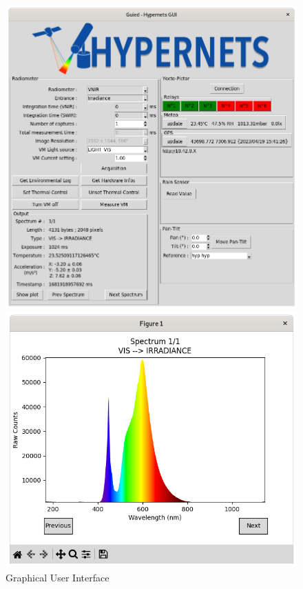 \begin{figure}[!ht]
  \centering
  \begin{minipage}[b]{0.48\textwidth}
	  \includegraphics[width=\linewidth]{images/gui_main.png}
	  \vspace{11pt}
	\vspace{-15pt}
	  \caption{Graphical User Interface}
	\label{fig:gui}
  \end{minipage}
  \hfill
  \begin{minipage}[b]{0.48\textwidth}
	  \includegraphics[width=\linewidth]{images/gui_spectrum.png}

\end{minipage}
\end{figure}
